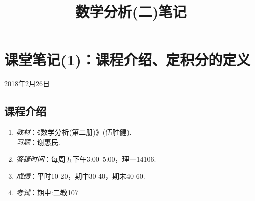 \documentclass[UTF8]{article}
\title{\heiti 数学分析(二)笔记}
\date{}
\begin{document}
\maketitle
\tableofcontents
\clearpage
\section{课堂笔记(1)：课程介绍、定积分的定义}
  \begin{center}
    {\kaishu 2018年2月26日}
  \end{center}
  \subsection{课程介绍}
    \begin{enumerate}
      \item \emph{教材}：《数学分析(第二册)》(伍胜健).\\\emph{习题}：谢惠民.
      \item \emph{答疑时间}：每周五下午3:00--5:00，理一14106.
      \item \emph{成绩}：平时10-20，期中30-40，期末40-60.
      \item \emph{考试}：期中:二教107
    \end{enumerate}
\end{document}
